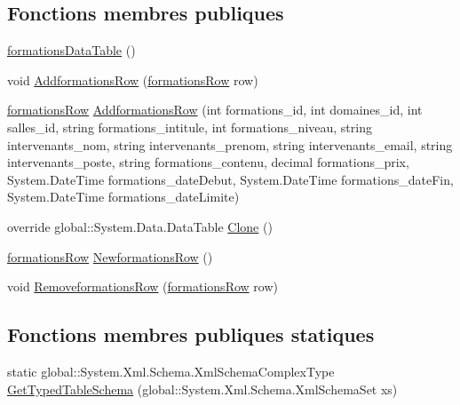 \subsection*{Fonctions membres publiques}
\begin{DoxyCompactItemize}
\item 
\hyperlink{classforma_1_1formadb_data_set_1_1formations_data_table_ad04878161a891ea5501c341cc9136df9}{formations\+Data\+Table} ()
\item 
void \hyperlink{classforma_1_1formadb_data_set_1_1formations_data_table_aff0ebb4110f97217b8585ff4a9a42ad8}{Addformations\+Row} (\hyperlink{classforma_1_1formadb_data_set_1_1formations_row}{formations\+Row} row)
\item 
\hyperlink{classforma_1_1formadb_data_set_1_1formations_row}{formations\+Row} \hyperlink{classforma_1_1formadb_data_set_1_1formations_data_table_a7c1bd9c44e836ff2bc3e10301073cc7f}{Addformations\+Row} (int formations\+\_\+id, int domaines\+\_\+id, int salles\+\_\+id, string formations\+\_\+intitule, int formations\+\_\+niveau, string intervenants\+\_\+nom, string intervenants\+\_\+prenom, string intervenants\+\_\+email, string intervenants\+\_\+poste, string formations\+\_\+contenu, decimal formations\+\_\+prix, System.\+Date\+Time formations\+\_\+date\+Debut, System.\+Date\+Time formations\+\_\+date\+Fin, System.\+Date\+Time formations\+\_\+date\+Limite)
\item 
override global\+::\+System.\+Data.\+Data\+Table \hyperlink{classforma_1_1formadb_data_set_1_1formations_data_table_af93e8b1d0f1fcfe5f910081a4569ba0d}{Clone} ()
\item 
\hyperlink{classforma_1_1formadb_data_set_1_1formations_row}{formations\+Row} \hyperlink{classforma_1_1formadb_data_set_1_1formations_data_table_ab36de3d01b195f76eeb9bd9fc801a3a1}{Newformations\+Row} ()
\item 
void \hyperlink{classforma_1_1formadb_data_set_1_1formations_data_table_a26ef5138bda8500299fdacc1f0e5262b}{Removeformations\+Row} (\hyperlink{classforma_1_1formadb_data_set_1_1formations_row}{formations\+Row} row)
\end{DoxyCompactItemize}
\subsection*{Fonctions membres publiques statiques}
\begin{DoxyCompactItemize}
\item 
static global\+::\+System.\+Xml.\+Schema.\+Xml\+Schema\+Complex\+Type \hyperlink{classforma_1_1formadb_data_set_1_1formations_data_table_a36912f4e2b5cb576fc5b9c46c4fa8f02}{Get\+Typed\+Table\+Schema} (global\+::\+System.\+Xml.\+Schema.\+Xml\+Schema\+Set xs)
\end{DoxyCompactItemize}
